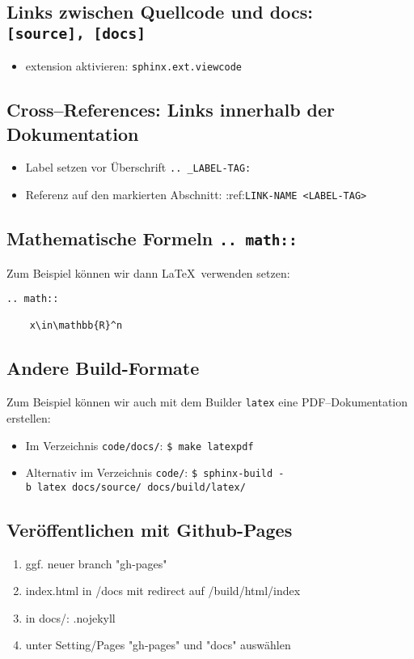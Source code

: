 \hypertarget{links-zwischen-quellcode-und-docs-source-docs}{%
\subsection{\texorpdfstring{Links zwischen Quellcode und docs:
\texttt{{[}source{]},\ {[}docs{]}}}{Links zwischen Quellcode und docs: {[}source{]}, {[}docs{]}}}\label{links-zwischen-quellcode-und-docs-source-docs}}

\begin{itemize}

	\item
	      extension aktivieren: \texttt{sphinx.ext.viewcode}
\end{itemize}

\hypertarget{crossreferences-links-innerhalb-der-dokumentation}{%
	\subsection{Cross--References: Links innerhalb der Dokumentation}\label{crossreferences-links-innerhalb-der-dokumentation}}

\begin{itemize}

	\item
	      Label setzen vor Überschrift \texttt{..\ \_LABEL-TAG:}
	\item
	      Referenz auf den markierten Abschnitt: 	:ref:\texttt{LINK-NAME\ \textless{}LABEL-TAG\textgreater{}}
\end{itemize}


\subsection{Mathematische Formeln \texttt{..\ math::}}
Zum Beispiel können wir dann \LaTeX\ verwenden setzen:
\begin{verbatim}
.. math::

    x\in\mathbb{R}^n
\end{verbatim}


\subsection{Andere Build-Formate}
Zum Beispiel können wir auch mit dem Builder \texttt{latex} eine PDF--Dokumentation erstellen:
\begin{itemize}
	\item
	      Im Verzeichnis \texttt{code/docs/}: \texttt{\$ make\ latexpdf}
	\item
	      Alternativ im Verzeichnis \texttt{code/}: \texttt{\$ sphinx-build\ -b\ latex\ docs/source/\ docs/build/latex/}
\end{itemize}



\subsection{Veröffentlichen mit Github-Pages}
\begin{enumerate}
	\item ggf. neuer branch "gh-pages"
	\item index.html in /docs mit redirect auf /build/html/index
	\item in docs/: .nojekyll
	\item unter Setting/Pages "gh-pages" und "docs" auswählen
\end{enumerate}

